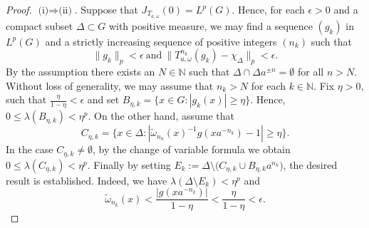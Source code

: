 \documentclass{amsart}
\theoremstyle{definition}\newtheorem{defn}[thm]{Definition}
\theoremstyle{remark}
\numberwithin{equation}{section}
\begin{document}
\begin{proof}
$\mbox{(i)}\Rightarrow \mbox{(ii)}$. Suppose that $J_{T_{a,\omega}}(0)=L^p(G)$.
Hence, for each $\epsilon>0$ and a compact subset $\Delta\subset G$ with positive measure,
we may find a sequence $(g_k)$ in $L^p(G)$ and a strictly increasing sequence of
positive integers $(n_k)$ such that $$\|g_k \|_p <\epsilon ~ \text{
and}~  \|T_{a,\omega}^{n_k}(g_k)-\chi_\Delta\|_p<\epsilon.$$
By the assumption
there exists an $N\in\mathbb{N}$ such that $\Delta \cap \Delta
a^{\pm n}=\emptyset$ for all $n>N$. Without loss of generality, we
may assume that $n_k>N$ for each $k\in \mathbb{N}$.
 Fix  $ \eta> 0$, such that $\frac{\eta}{1-\eta}<\epsilon$
and set $B_{\eta,k}=\{x\in G: |g_k(x)|\geq\eta\}$.
Hence, $0\leq\lambda(B_{\eta,k})<\eta^p$. On the other hand, assume that
$$C_{\eta,k}=\{x\in\Delta:|\tilde{\omega}_{n_k}(x)^{-1}g(xa^{-n_k})-1|\geq\eta\}.$$
In the case $C_{\eta,k}\neq \emptyset$, by the
change of variable formula  we obtain $0\leq\lambda(C_{\eta,k})<\eta^p$.
Finally by setting $E_k:=\Delta\setminus \big(C_{\eta,k}\cup
B_{\eta,k}a^{n_k}\big)$, the desired result is established. Indeed,
we have $\lambda(\Delta\setminus E_k)<\eta^p$ and
$$
\tilde{\omega}_{n_k}(x)<\frac{|g(xa^{-n_k})|}{1-\eta}
<\frac{\eta}{1-\eta}<\epsilon.
$$





\end{proof}
\end{document}
